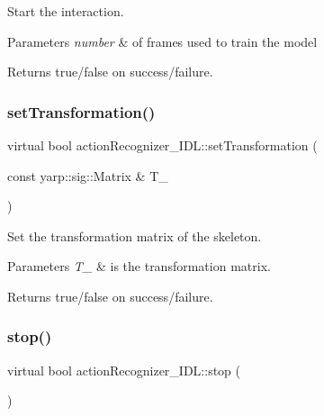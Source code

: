 Start the interaction. 


\begin{DoxyParams}{Parameters}
{\em number} & of frames used to train the model \\
\hline
\end{DoxyParams}
\begin{DoxyReturn}{Returns}
true/false on success/failure. 
\end{DoxyReturn}
\mbox{\label{classactionRecognizer__IDL_a6fab377e711dc0334dec6442dfdfec5d}} 
\subsubsection{\texorpdfstring{set\+Transformation()}{setTransformation()}}
{\footnotesize\ttfamily virtual bool action\+Recognizer\+\_\+\+I\+D\+L\+::set\+Transformation (\begin{DoxyParamCaption}\item[{const yarp\+::sig\+::\+Matrix \&}]{T\+\_\+ }\end{DoxyParamCaption})\hspace{0.3cm}{\ttfamily [virtual]}}



Set the transformation matrix of the skeleton. 


\begin{DoxyParams}{Parameters}
{\em T\+\_\+} & is the transformation matrix. \\
\hline
\end{DoxyParams}
\begin{DoxyReturn}{Returns}
true/false on success/failure. 
\end{DoxyReturn}
\mbox{\label{classactionRecognizer__IDL_ad1f380a935e15eece41825108b7c1e0e}} 
\subsubsection{\texorpdfstring{stop()}{stop()}}
{\footnotesize\ttfamily virtual bool action\+Recognizer\+\_\+\+I\+D\+L\+::stop (\begin{DoxyParamCaption}{ }\end{DoxyParamCaption})\hspace{0.3cm}{\ttfamily [virtual]}}



